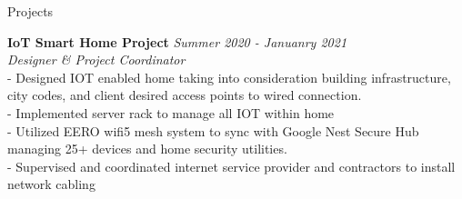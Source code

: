\documentclass{resume} %
\begin{document}
\begin{rSection}{Projects} %

{\bf IoT Smart Home Project} \hfill {\em Summer 2020 - Januanry 2021}
\\{\textit{Designer \& Project Coordinator}}
\\- Designed IOT enabled home taking into consideration building infrastructure, city codes, and client desired access points to wired connection.
\\ - Implemented server rack to manage all IOT within home
\\- Utilized EERO wifi5 mesh system to sync with Google Nest Secure Hub managing 25+ devices and home security utilities.
\\- Supervised and coordinated internet service provider and contractors to install network cabling



\end{rSection}

\end{document}

